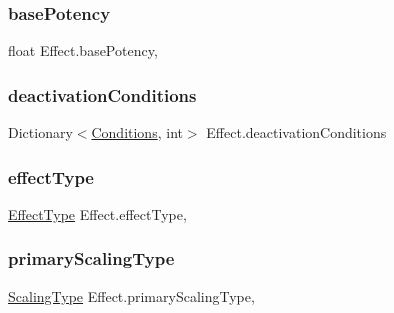 \subsubsection{\texorpdfstring{basePotency}{basePotency}}
{\footnotesize\ttfamily float Effect.\+base\+Potency\hspace{0.3cm}{\ttfamily [get]}, {\ttfamily [set]}}

\mbox{\label{class_effect_a364788c565859970111c834c3da7f15d}} 
\subsubsection{\texorpdfstring{deactivationConditions}{deactivationConditions}}
{\footnotesize\ttfamily Dictionary$<$\mbox{\hyperlink{class_effect_ab13a718053e330a11f9f66a9b16f4686}{Conditions}}, int$>$ Effect.\+deactivation\+Conditions\hspace{0.3cm}{\ttfamily [get]}}

\mbox{\label{class_effect_a5cf8eca9899b1ce70a9cdad8ab6f5f1e}} 
\subsubsection{\texorpdfstring{effectType}{effectType}}
{\footnotesize\ttfamily \mbox{\hyperlink{class_effect_a28d85888db94ec53ee9cb75e9706f6e4}{Effect\+Type}} Effect.\+effect\+Type\hspace{0.3cm}{\ttfamily [get]}, {\ttfamily [set]}}

\mbox{\label{class_effect_a008086eef4214cbf113387f8ac5ed1cc}} 
\subsubsection{\texorpdfstring{primaryScalingType}{primaryScalingType}}
{\footnotesize\ttfamily \mbox{\hyperlink{class_effect_af0ada789de40f58c24c46bf8ed2f300c}{Scaling\+Type}} Effect.\+primary\+Scaling\+Type\hspace{0.3cm}{\ttfamily [get]}, {\ttfamily [set]}}

